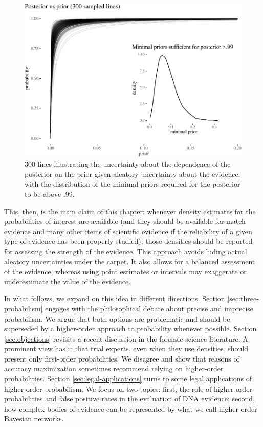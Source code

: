 \documentclass[
  10pt,
  dvipsnames,enabledeprecatedfontcommands]{scrartcl}
\begin{document}
\begin{figure}[H]

\begin{center}\includegraphics[width=0.6\linewidth]{paper-outline_files/figure-latex/fig:lines5-1} \end{center}

\caption{300 lines illustrating the uncertainty about the dependence of the posterior on the prior given aleatory uncertainty about the evidence, with the distribution of the minimal priors required for the posterior to be above .99.}

\label{fig:lines}

\end{figure}

This, then, is the main claim of this chapter: whenever density
estimates for the probabilities of interest are available (and they
should be available for match evidence and many other items of
scientific evidence if the reliability of a given type of evidence has
been properly studied), those densities should be reported for assessing
the strength of the evidence. This approach avoids hiding actual
aleatory uncertainties under the carpet. It also allows for a balanced
assessment of the evidence, whereas using point estimates or intervals
may exaggerate or underestimate the value of the evidence.

In what follows, we expand on this idea in different directions. Section
\ref{sec:three-probabilism} engages with the philosophical debate about
precise and imprecise probabilism. We argue that both options are
problematic and should be superseded by a higher-order approach to
probability whenever possible. Section \ref{sec:objections} revisits a
recent discussion in the forensic science literature. A prominent view
has it that trial experts, even when they use densities, should present
only first-order probabilities. We disagree and show that reasons of
accuracy maximization sometimes recommend relying on higher-order
probabilities. Section \ref{sec:legal-applications} turns to some legal
applications of higher-order probabilism. We focus on two topics: first,
the role of higher-order probabilities and false positive rates in the
evaluation of DNA evidence; second, how complex bodies of evidence can
be represented by what we call higher-order Bayesian networks.
\end{document}
